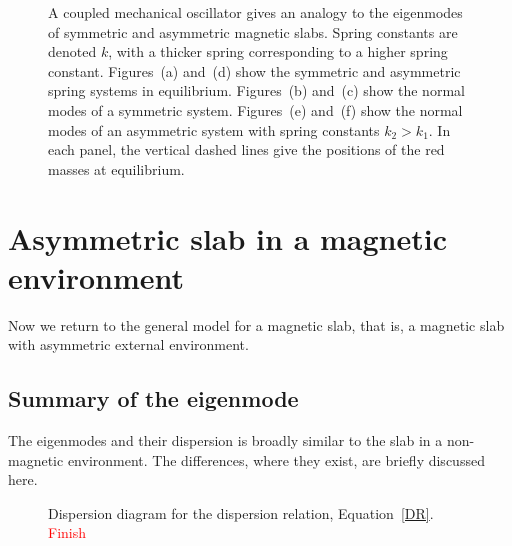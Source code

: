 \documentclass[12pt]{../style-files/ociamthesis}
\begin{document}
\begin{figure}
{{{
			\label{fig: springs asym anti-phase}}}}

	\caption{A coupled mechanical oscillator gives an analogy to the eigenmodes of symmetric and asymmetric magnetic slabs. Spring constants are denoted $k$, with a thicker spring corresponding to a higher spring constant. Figures~(a) and~(d) show the symmetric and asymmetric spring systems in equilibrium. Figures~(b) and~(c) show the normal modes of a symmetric system. Figures~(e) and~(f) show the normal modes of an asymmetric system with spring constants $k_2 > k_1$. In each panel, the vertical dashed lines give the positions of the red masses at equilibrium.}
	\label{fig: springs all}
\end{figure}


\section{Asymmetric slab in a magnetic environment}
\label{sec: EVP mag}

Now we return to the general model for a magnetic slab, that is, a magnetic slab with asymmetric external environment.

\subsection{Summary of the eigenmode}

The eigenmodes and their dispersion is broadly similar to the slab in a non-magnetic environment. The differences, where they exist, are briefly discussed here.

\begin{figure}[]
	\centering
	\caption{Dispersion diagram for the dispersion relation, Equation~\eqref{DR}. \textcolor{red}{Finish}}
	\label{fig: disp mag}
\end{figure}
\end{document}
